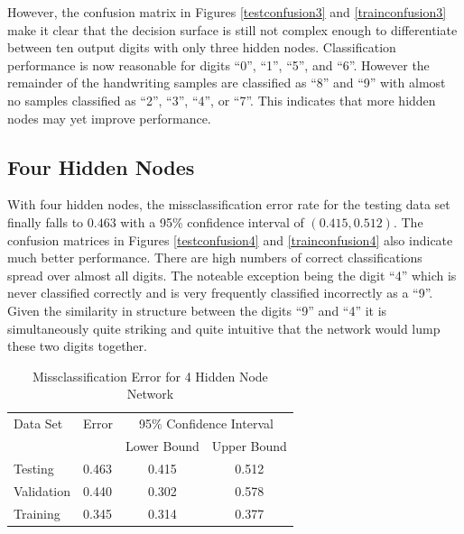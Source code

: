 \documentclass{article}
\begin{document}
However, the confusion matrix in Figures \ref{testconfusion3} and \ref{trainconfusion3} make it clear that the decision surface is still not complex enough to differentiate between ten output digits with only three hidden nodes. Classification performance is now reasonable for digits ``0'', ``1'', ``5'', and ``6''. However the remainder of the handwriting samples are classified as ``8'' and ``9'' with almost no samples classified as ``2'', ``3'', ``4'', or ``7''. This indicates that more hidden nodes may yet improve performance. 

\subsection{Four Hidden Nodes}\label{hidden4}

With four hidden nodes, the missclassification error rate for the testing data set finally falls to \(0.463\) with a 95\% confidence interval of \((0.415 , 0.512)\). The confusion matrices in Figures \ref{testconfusion4} and \ref{trainconfusion4} also indicate much better performance. There are high numbers of correct classifications spread over almost all digits. The noteable exception being the digit ``4'' which is never classified correctly and is very frequently classified incorrectly as a ``9''. Given the similarity in structure between the digits ``9'' and ``4'' it is simultaneously quite striking and quite intuitive that the network would lump these two digits together.

\begin{table}
\caption{Missclassification Error for 4 Hidden Node Network}
\begin{center}
\begin{tabular}{llcc}
\toprule
Data Set & Error & \multicolumn{2}{c}{95\% Confidence Interval} \\
\cmidrule(r){3-4}
& & Lower Bound & Upper Bound \\
\midrule
Testing       & 0.463 &  0.415 & 0.512  \\
Validation    & 0.440 &  0.302 & 0.578  \\
Training      & 0.345 &  0.314 & 0.377  \\
\bottomrule
\end{tabular}
\label{table4}
\end{center}
\end{table}
\end{document}
